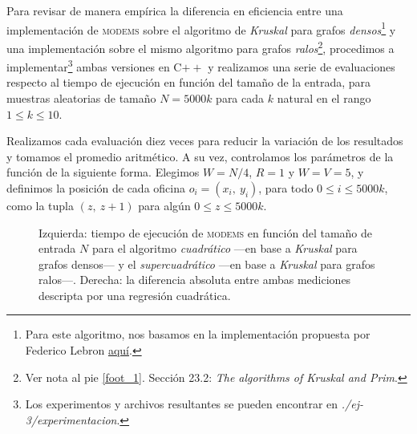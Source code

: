 

Para revisar de manera empírica la diferencia en eficiencia entre una implementación de \textsc{modems} sobre el algoritmo de \textit{Kruskal} para grafos \textit{densos}\footnote{Para este algoritmo, nos basamos en la implementación propuesta por Federico Lebron \href{https://fedelebron.com/a-dense-version-of-kruskals-algorithm}{\color{blue} aquí}.} y una implementación sobre el mismo algoritmo para grafos \textit{ralos}\footnote{Ver nota al pie \ref{foot_1}. Sección 23.2: \textit{The algorithms of Kruskal and Prim}.}, procedimos a implementar\footnote{Los experimentos y archivos resultantes se pueden encontrar en \textit{./ej-3/experimentacion}.} ambas versiones en C$++$ y realizamos una serie de evaluaciones respecto al tiempo de ejecución en función del tamaño de la entrada, para muestras aleatorias de tamaño $N = 5000k$ para cada $k$ natural en el rango $1 \leq k \leq 10$. 

Realizamos cada evaluación diez veces para reducir la variación de los resultados y tomamos el promedio aritmético. 
A su vez, controlamos los parámetros de la función de la siguiente forma. Elegimos \mbox{$W = N/4$}, $R = 1$ y $W = V = 5$, y definimos la posición de cada oficina $o_i = (x_i,\ y_i)$, para todo $0 \leq i \leq 5000k$, como la tupla $(z,\ z+1)$ para algún $0 \leq z \leq 5000k$. 

\begin{figure}[!htbp]

    \caption{Izquierda: tiempo de ejecución de \textsc{modems} en función del tamaño de entrada $N$ para el algoritmo \textit{cuadrático} ---en base a \textit{Kruskal} para grafos densos--- y el \textit{supercuadrático} ---en base a \textit{Kruskal} para grafos ralos---. Derecha: la diferencia absoluta entre ambas mediciones descripta por una regresión cuadrática.}
    \label{grafico_1}
\end{figure}

